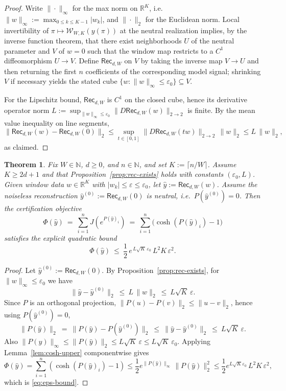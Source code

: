 \documentclass[11pt,reqno]{amsart}
\newtheorem{theorem}{Theorem}[section]
\theoremstyle{definition}
\theoremstyle{remark}
\newcommand{\R}{\mathbb{R}}
\newcommand{\1}{\mathbf{1}}
\providecommand{\N}{\mathbb{N}}
\begin{document}
\begin{proof}
Write $\|\cdot\|_\infty$ for the max norm on $\R^K$, i.e.\ $\|w\|_\infty:=\max_{0\le k\le K-1}|w_k|$, and $\|\cdot\|_2$ for the Euclidean norm.
Local invertibility of $\pi\mapsto \mathcal{W}_{W,K}(y(\pi))$ at the neutral realization implies, by the inverse function theorem, that there exist
neighborhoods $U$ of the neutral parameter and $V$ of $w=0$ such that the window map restricts to a $C^1$ diffeomorphism $U\to V$.
Define $\mathsf{Rec}_{d,W}$ on $V$ by taking the inverse map $V\to U$ and then returning the first $n$ coefficients of the corresponding model signal;
shrinking $V$ if necessary yields the stated cube $\{w:\|w\|_\infty\le \varepsilon_0\}\subseteq V$.

For the Lipschitz bound, $\mathsf{Rec}_{d,W}$ is $C^1$ on the closed cube, hence its derivative operator norm
$L:=\sup_{\|w\|_\infty\le \varepsilon_0}\|D\mathsf{Rec}_{d,W}(w)\|_{2\to 2}$ is finite.
By the mean value inequality on line segments,
\[
\|\mathsf{Rec}_{d,W}(w)-\mathsf{Rec}_{d,W}(0)\|_2
\le \sup_{t\in[0,1]}\|D\mathsf{Rec}_{d,W}(tw)\|_{2\to 2}\,\|w\|_2
\le L\,\|w\|_2,
\]
as claimed.
\end{proof}


\begin{theorem}\label{thm:eps-tolerant}
Fix $W\in\N$, $d\ge 0$, and $n\in\N$, and set $K:=\lceil n/W\rceil$.
Assume $K\ge 2d+1$ and that Proposition~\ref{prop:rec-exists} holds with constants $(\varepsilon_0,L)$.
Given window data $w\in\R^K$ with $|w_k|\le \varepsilon\le \varepsilon_0$, let $\hat y:=\mathsf{Rec}_{d,W}(w)$.
Assume the noiseless reconstruction $\hat y^{(0)}:=\mathsf{Rec}_{d,W}(0)$ is neutral, i.e.\ $P(\hat y^{(0)})=0$.
Then the certification objective
\[
\Phi(\hat y)\:=\ \sum_{i=1}^n J\!\left(e^{P(\hat y)_i}\right)\ =\ \sum_{i=1}^n \bigl(\cosh(P(\hat y)_i)-1\bigr)
\]
satisfies the explicit quadratic bound
\begin{equation}\label{eq:eps-bound}
\Phi(\hat y)\ \le\ \frac12\,e^{\,L\sqrt{K}\,\varepsilon_0}\,L^2K\,\varepsilon^2.
\end{equation}
\end{theorem}

\begin{proof}
Let $\hat y^{(0)}:=\mathsf{Rec}_{d,W}(0)$. By Proposition~\ref{prop:rec-exists}, for $\|w\|_\infty\le\varepsilon_0$ we have
\[
\|\hat y-\hat y^{(0)}\|_2\ \le\ L\,\|w\|_2 \ \le\ L\sqrt{K}\,\varepsilon.
\]
Since $P$ is an orthogonal projection, $\|P(u)-P(v)\|_2\le \|u-v\|_2$, hence using $P(\hat y^{(0)})=0$,
\[
\|P(\hat y)\|_2 \ =\ \|P(\hat y)-P(\hat y^{(0)})\|_2 \ \le\ \|\hat y-\hat y^{(0)}\|_2
\ \le\ L\sqrt{K}\,\varepsilon.
\]
Also $\|P(\hat y)\|_\infty\le \|P(\hat y)\|_2\le L\sqrt{K}\,\varepsilon \le L\sqrt{K}\,\varepsilon_0$.
Applying Lemma~\ref{lem:cosh-upper} componentwise gives
\[
\Phi(\hat y)=\sum_{i=1}^n(\cosh(P(\hat y)_i)-1)
\le \frac12 e^{\|P(\hat y)\|_\infty}\,\|P(\hat y)\|_2^2
\le \frac12 e^{L\sqrt{K}\varepsilon_0}\,L^2K\,\varepsilon^2,
\]
which is \eqref{eq:eps-bound}.
\end{proof}
\end{document}
